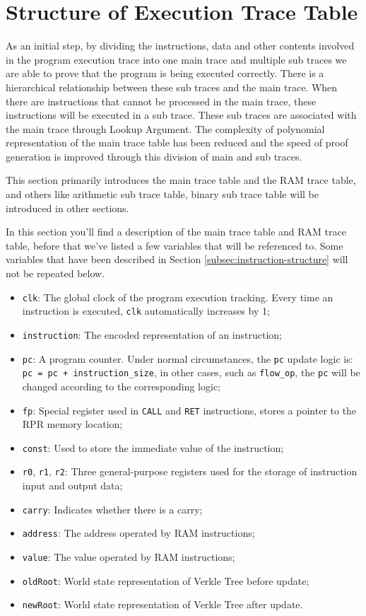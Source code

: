 \section{Structure of Execution Trace Table} \label{sec:structure-of-execution-trace-table}

As an initial step, by dividing the instructions, data and other contents involved in the program execution trace into one main trace and multiple sub traces we are able to prove that the program is being executed correctly. There is a hierarchical relationship between these sub traces and the main trace. When there are instructions that cannot be processed in the main trace, these instructions will be executed in a sub trace. These sub traces are associated with the main trace through Lookup Argument. The complexity of polynomial representation of the main trace table has been reduced and the speed of proof generation is improved through this division of main and sub traces.

This section primarily introduces the main trace table and the RAM trace table, and others like arithmetic sub trace table, binary sub trace table will be introduced in other sections.

In this section you'll find a description of the main trace table and RAM trace table, before that we've listed a few variables that will be referenced to. Some variables that have been described in Section \ref{subsec:instruction-structure} will not be repeated below.
\begin{itemize}
    \item \verb|clk|: The global clock of the program execution tracking. Every time an instruction is executed, \verb|clk| automatically increases by 1;
    \item \verb|instruction|: The encoded representation of an instruction;
    \item \verb|pc|: A program counter. Under normal circumstances, the \verb|pc| update logic is: \verb|pc = pc + instruction_size|, in other cases, such as \verb|flow_op|, the \verb|pc| will be changed according to the corresponding logic;
    \item \verb|fp|: Special register used in \verb|CALL| and \verb|RET| instructions, stores a pointer to the RPR memory location;
    \item \verb|const|: Used to store the immediate value of the instruction;
    \item \verb|r0|, \verb|r1|, \verb|r2|: Three general-purpose registers used for the storage of instruction input and output data;
    \item \verb|carry|: Indicates whether there is a carry;
    \item \verb|address|: The address operated by RAM instructions;
    \item \verb|value|: The value operated by RAM instructions;
    \item \verb|oldRoot|: World state representation of Verkle Tree before update;
    \item \verb|newRoot|: World state representation of Verkle Tree after update.
\end{itemize}



